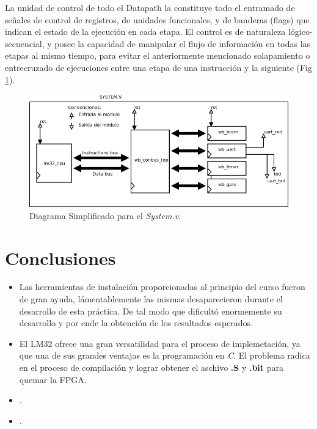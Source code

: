 \documentclass[twocolumn]{IEEEtran}
\begin{document}
La unidad de control de todo el Datapath la constituye todo el entramado de señales de control de registros, de unidades funcionales, y de banderas (flags) que indican el estado de la ejecución en cada etapa. El control es de naturaleza lógico-secuencial, y posee la capacidad de manipular el flujo de información en todas las etapas al mismo tiempo, para evitar el anteriormente mencionado solapamiento o entrecruzado de ejecuciones entre una etapa de una instrucción y la siguiente (Fig \ref{fig1}).
\begin{figure}[]
	\centering
		\includegraphics[scale=0.4]{system_v.png}
	\caption{Diagrama Simplificado para el \textit{System.v}.}
	\label{fig1}
\end{figure}


\section{Conclusiones}
\begin{itemize}
 \item Las herramientas de instalación proporcionadas al principio del curso fueron de gran ayuda, lámentablemente las mismas desaparecieron durante el desarrollo de esta práctica. De tal modo que dificultó enormemente su desarrollo y por ende la obtención de los resultados esperados.
 \item El LM32 ofrece una gran versatilidad para el proceso de implemetación, ya que una de sus grandes ventajas es la programación en \textit{C}. El problema radica en el proceso de compilación y lograr obtener el aschivo \textbf{.S} y \textbf{.bit} para quemar la FPGA.
 \item .
 \item .
\end{itemize}
\end{document}
